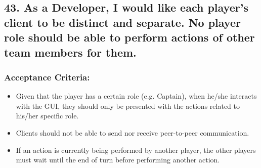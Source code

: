 \subsection*{43. As a Developer, I would like each player's client to be distinct and separate. No player role should be able to perform actions of other team members for them.
}


\subsubsection*{Acceptance Criteria:}

\begin{itemize}
\item Given that the player has a certain role (e.g. Captain), when he/she interacts with the GUI, they should only be presented with the actions related to his/her specific role.
\item Clients should not be able to send nor receive peer-to-peer communication.
\item If an action is currently being performed by another player, the other players must wait until the end of turn before performing another action.
\end{itemize}
